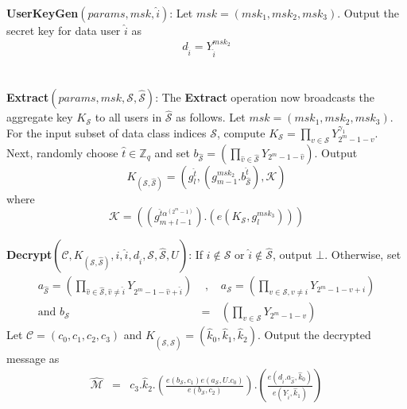\noindent\textbf{UserKeyGen}$(params,msk,\hat{i})$: Let $msk=(msk_1,msk_2,msk_3)$. Output the secret key for data user $\hat{i}$ as
\begin{equation}
 d_{\hat{i}}=Y^{msk_2}_{\hat{i}}\nonumber 
\end{equation}
\\\\
% 
\noindent\textbf{Extract}$(params,msk,\mathcal{S},\hat{\mathcal{S}})$: The \textbf{Extract} operation now broadcasts the aggregate key $K_{\mathcal{S}}$ to all users in $\hat{\mathcal{S}}$ as follows. Let $msk=(msk_1,msk_2,msk_3)$. For the input subset of data class indices $\mathcal{S}$, compute $K_{\mathcal{S}} = \prod_{v\in\mathcal{S}}Y^{\gamma_1}_{2^m-1-v}$. Next, randomly choose $\hat{t}\in\mathbb{Z}_q$ and set $b_{\hat{\mathcal{S}}}=\left(\prod_{\hat{v}\in\hat{\mathcal{S}}}Y_{2^m-1-\hat{v}}\right)$. Output 
\begin{equation}
K_{\left(\mathcal{S},\hat{\mathcal{S}}\right)}=\left(g^{\hat{t}}_{l},\left(g^{msk_2}_{m-1}.b^{\hat{t}}_{\hat{\mathcal{S}}}\right),\mathcal{K}\right)\nonumber
\end{equation}
\noindent where 
\begin{equation}
\mathcal{K} = \left(\left(g^{\hat{t}\alpha^{(2^m-1)}}_{m+l-1}\right).\left(e(K_{\mathcal{S}},g^{msk_3}_{l})\right)\right)\nonumber
\end{equation}

%  
\noindent\textbf{Decrypt}$(\mathcal{C},K_{\left(\mathcal{S},\hat{\mathcal{S}}\right)},i,\hat{i},d_{\hat{i}},\mathcal{S},\hat{\mathcal{S}},U)$: If $i\notin\mathcal{S}$ or $\hat{i}\notin\hat{\mathcal{S}}$, output $\bot$. Otherwise, set
\begin{eqnarray}
 a_{\hat{\mathcal{S}}}=\left(\prod_{\hat{v}\in\hat{\mathcal{S}},\hat{v}\neq \hat{i}}Y_{2^m-1-\hat{v}+\hat{i}}\right)&\text{ , }&
 a_{\mathcal{S}}=\left(\prod_{v\in\mathcal{S},v\neq i}Y_{2^m-1-v+i}\right)\nonumber\\ 
 \text{and }b_{\mathcal{S}}&=&\left(\prod_{v\in\mathcal{S}}Y_{2^m-1-v}\right)\nonumber
\end{eqnarray}
\noindent Let $\mathcal{C}=(c_0,c_1,c_2,c_3)$ and $K_{\left(\mathcal{S},\hat{\mathcal{S}}\right)}=(\hat{k}_0,\hat{k}_1,\hat{k}_2)$. Output the decrypted message as  
\begin{eqnarray} 
\hat{\mathcal{M}}&=&c_3.\hat{k}_2.\left(\frac{e(b_{\mathcal{S}},c_1){e}(a_{\mathcal{S}},U.c_0)}{{e}(b_{\mathcal{S}},c_2)}\right).\left(\frac{e(d_{\hat{i}}.a_{\hat{\mathcal{S}}},\hat{k}_0)}{e(Y_{\hat{i}},\hat{k}_1)}\right) \nonumber
\end{eqnarray}


